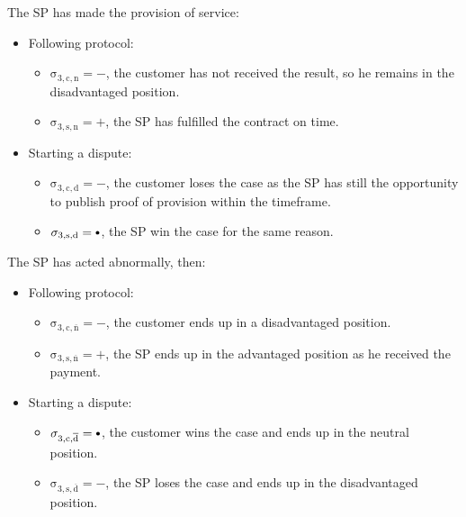 \documentclass{ieeeaccess}
\newcommand\neutral[1][.75]{\mathbin{\ThisStyle{\vcenter{\hbox{%
  \scalebox{#1}{$\SavedStyle\bullet$}}}}}%
}
\begin{document}
The SP has made the provision of service:

\begin{itemize}
\item
  Following protocol:

  \begin{itemize}
  
  \item
    \(\operatorname{\sigma_{3, c, n} = -}\), the customer has not received the result, so he remains in the disadvantaged position. 
  \item
    \(\operatorname{\sigma_{3, s, n} = +}\), the SP has fulfilled the contract on time.
  \end{itemize}
\item
  Starting a dispute:

  \begin{itemize}
  
  \item
    \(\operatorname{\sigma_{3, c, d} = -}\), the customer loses the case as the SP has still the opportunity to publish proof of provision within the timeframe. 
  \item
    \(\operatorname{\sigma_{3, s, d} = \neutral}\), the SP win the case for the same reason.
  \end{itemize}
\end{itemize}

The SP has acted abnormally, then:

\begin{itemize}
\item
  Following protocol:

  \begin{itemize}
  
  \item
    \(\operatorname{\sigma_{3, c, \overline{n}} = -}\), the customer ends up in a disadvantaged position.
  \item
    \(\operatorname{\sigma_{3, s, \overline{n}} = +}\), the SP ends up in the advantaged position as he received the payment. 
  \end{itemize}
\item
  Starting a dispute:

  \begin{itemize}
  
  \item
    \(\operatorname{\sigma_{3, c, \overline{d}} = \neutral}\), the customer wins the case and ends up in the neutral position.
  \item
    \(\operatorname{\sigma_{3, s, \overline{d}} = -}\), the SP loses the case and ends up in the disadvantaged position. 
  \end{itemize}
\end{itemize}
\end{document}
